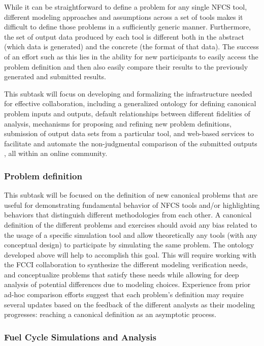 While it can be straightforward to define a problem for any single \gls{NFCS} tool,
different modeling approaches and assumptions across a set of tools makes it
difficult to define those problems in a sufficiently generic manner.
Furthermore, the set of output data produced by each tool is different both in
the abstract (which data is generated) and the concrete (the format of that
data). The success of an effort such as this lies in the ability for new
participants to easily access the problem definition and then also easily
compare their results to the previously generated and submitted results.

This subtask will focus on developing and formalizing the infrastructure
needed for effective collaboration, including a generalized ontology for
defining canonical problem inputs and outputs, default relationships between
different fidelities of analysis, mechanisms for proposing and refining new
problem definitions, submission of output data sets from a particular tool,
and web-based services to facilitate and automate the non-judgmental
comparison of the submitted outputs \cite{scopatz.NT.2016}, all within an online community.

\subsubsection{Problem definition} 

This subtask will be focused on the definition of new canonical problems that are
useful for demonstrating fundamental behavior of \gls{NFCS} tools and/or
highlighting behaviors that distinguish different methodologies from each
other. A canonical definition of the different problems and exercises should
avoid any bias related to the usage of a specific simulation tool and allow
theoretically any tools (with any conceptual design) to participate by
simulating the same problem. The ontology developed above will help to
accomplish this goal. This will require working with the \gls{FCCI}
collaboration to synthesize the different modeling verification needs, and
conceptualize problems that satisfy these needs while allowing for deep
analysis of potential differences due to modeling choices.  Experience from
prior ad-hoc comparison efforts suggest that each problem’s definition may
require several updates based on the feedback of the different analysts as
their modeling progresses: reaching a canonical definition as an asymptotic
process.

\subsubsection{Fuel Cycle Simulations and Analysis} 

